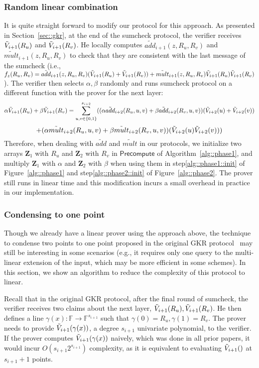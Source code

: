 \subsubsection{Random linear combination}
It is quite straight forward to modify our protocol for this approach. As presented in Section~\ref{sec::gkr}, at the end of the sumcheck protocol, the verifier receives $\tilde{V}_{i+1}(R_u)$ and $\tilde{V}_{i+1}(R_v)$.  He locally computes $\tilde{add}_{i+1}(z,R_u,R_v)$ and $\tilde{mult}_{i+1}(z,R_u,R_v)$ to check that they are consistent with the last message of the sumcheck (i.e., $f_z(R_u,R_v) = \tilde{add}_{i+1}(z,R_u,R_v)(\tilde{V}_{i+1}(R_u)+\tilde{V}_{i+1}(R_v))+\tilde{mult}_{i+1}(z,R_u,R_v)\tilde{V}_{i+1}(R_u)\tilde{V}_{i+1}(R_v)$). The verifier then selects $\alpha,\beta$ randomly and runs sumcheck protocol on a different function with the prover for the next layer:
\[
\alpha\tilde{V}_{i+1}(R_u)+\beta\tilde{V}_{i+1}(R_v) = \sum_{u,v\in\{0,1\}}^{s_{i+2}}((\alpha\tilde{add}_{i+2}(R_u,u,v)+\beta\tilde{add}_{i+2}(R_v,u,v))(\tilde{V}_{i+2}(u)+\tilde{V}_{i+2}(v))
\]
\[+(\alpha\tilde{mult}_{i+2}(R_u,u,v)+\beta\tilde{mult}_{i+2}(R_v,u,v))(\tilde{V}_{i+2}(u)\tilde{V}_{i+2}(v)))
\]
Therefore, when dealing with $\tilde{add}$ and $\tilde{mult}$ in our protocols, we initialize two arrays $\textbf{Z}_1$ with $R_u$ and $\textbf{Z}_2$ with $R_v$ in $\mathsf{Precompute}$ of Algorithm~\ref{alg::phase1}, and multiply $\textbf{Z}_1$ with $\alpha$ and $\textbf{Z}_2$ with $\beta$ when using them in step\ref{alg::phase1::init} of Figure~\ref{alg::phase1} and step\ref{alg::phase2::init} of Figure~\ref{alg::phase2}. The prover still runs in linear time and this modification incurs a small overhead in practice in our implementation.

\subsubsection{Condensing to one point}

Though we already have a linear prover using the approach above, the technique to condense two points to one point proposed in the original GKR protocol~\cite{GKR} may still be interesting in some scenarios (e.g., it requires only one query to the multi-linear extension of the input, which may be more efficient in some schemes). In this section, we show an algorithm to reduce the complexity of this protocol to linear.

Recall that in the original GKR protocol, after the final round of sumcheck, the verifier receives two claims about the next layer, $\tilde{V}_{i+1}(R_u), \tilde{V}_{i+1}(R_v)$. He then defines a line $\gamma(x): \mathbb{F}\rightarrow\mathbb{F}^{s_{i+1}}$ such that $\gamma(0) = R_u, \gamma(1)=R_v$. The prover needs to provide $\tilde{V}_{i+1}(\gamma(x))$, a degree $s_{i+1}$ univariate polynomial, to the verifier. If the prover computes $\tilde{V}_{i+1}(\gamma(x))$ naively, which was done in all prior papers, it would incur $O(s_{i+1}2^{s_{i+1}})$ complexity, as it is equivalent to evaluating $\tilde{V}_{i+1}()$ at $s_{i+1}+1$ points. 

